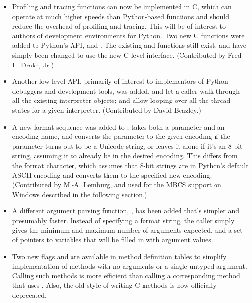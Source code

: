 \documentclass{howto}
\begin{document}
\begin{itemize}

  \item Profiling and tracing functions can now be implemented in C,
  which can operate at much higher speeds than Python-based functions
  and should reduce the overhead of profiling and tracing.  This 
  will be of interest to authors of development environments for
  Python.  Two new C functions were added to Python's API,
   and .
  The existing  and
   functions still exist, and have simply
  been changed to use the new C-level interface.  (Contributed by Fred
  L. Drake, Jr.)

  \item Another low-level API, primarily of interest to implementors
  of Python debuggers and development tools, was added.
   and
   let a caller walk through all
  the existing interpreter objects;
   and
   allow looping over all the thread
  states for a given interpreter.  (Contributed by David Beazley.)

  \item A new  format sequence was added to
  ;  takes both a parameter and
  an encoding name, and converts the parameter to the given encoding
  if the parameter turns out to be a Unicode string, or leaves it
  alone if it's an 8-bit string, assuming it to already be in the
  desired encoding.  This differs from the  format character,
  which assumes that 8-bit strings are in Python's default ASCII
  encoding and converts them to the specified new encoding.
  (Contributed by M.-A. Lemburg, and used for the MBCS support on
  Windows described in the following section.)

  \item A different argument parsing function,
  , has been added that's simpler and
  presumably faster.  Instead of specifying a format string, the
  caller simply gives the minimum and maximum number of arguments
  expected, and a set of pointers to  variables that
  will be filled in with argument values.  

  \item Two new flags  and  are
   available in method definition tables to simplify implementation of
   methods with no arguments or a single untyped argument. Calling
   such methods is more efficient than calling a corresponding method
   that uses . 
   Also, the old  style of writing C methods is 
   now officially deprecated.  


\end{itemize}
\end{document}
